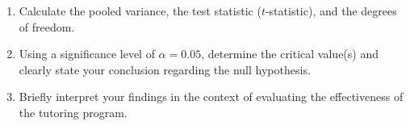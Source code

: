 \documentclass{article}
\begin{document}
\begin{enumerate}
\begin{enumerate}[label=(\alph*)]
\item Calculate the pooled variance, the test statistic ($t$-statistic), and the degrees of freedom.

\item Using a significance level of $\alpha = 0.05$, determine the critical value(s) and clearly state your conclusion regarding the null hypothesis.

\item Briefly interpret your findings in the context of evaluating the effectiveness of the tutoring program.

\end{enumerate}

\end{enumerate}
\end{document}
